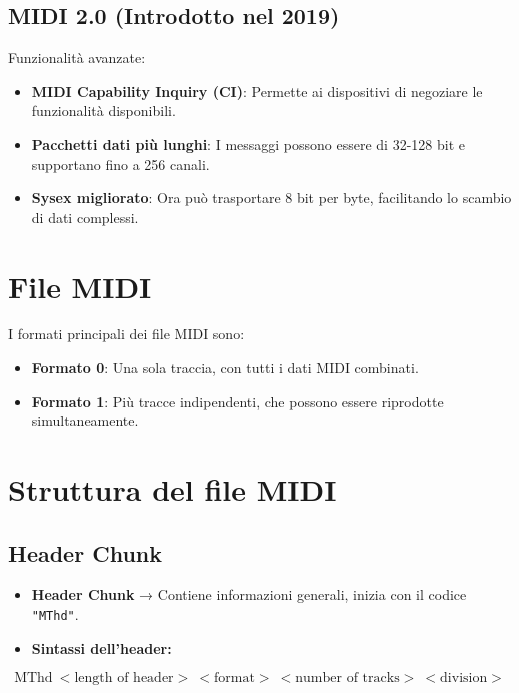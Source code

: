\subsection*{MIDI 2.0 (Introdotto nel 2019)}

Funzionalità avanzate:

\begin{itemize}
    \item \textbf{MIDI Capability Inquiry (CI)}: Permette ai dispositivi di negoziare le funzionalità disponibili.
    \item \textbf{Pacchetti dati più lunghi}: I messaggi possono essere di 32-128 bit e supportano fino a 256 canali.
    \item \textbf{Sysex migliorato}: Ora può trasportare 8 bit per byte, facilitando lo scambio di dati complessi.
\end{itemize}

\section{File MIDI}

I formati principali dei file MIDI sono:

\begin{itemize}
    \item \textbf{Formato 0}: Una sola traccia, con tutti i dati MIDI combinati.
    \item \textbf{Formato 1}: Più tracce indipendenti, che possono essere riprodotte simultaneamente.
\end{itemize}

\section{Struttura del file MIDI}

\subsection*{Header Chunk}

\begin{itemize}
    \item \textbf{Header Chunk} → Contiene informazioni generali, inizia con il codice \texttt{"MThd"}.
    \item \textbf{Sintassi dell'header:}
\end{itemize}

\[
\text{MThd} \ <\text{length of header}> \ <\text{format}> \ <\text{number of tracks}> \ <\text{division}>
\]

